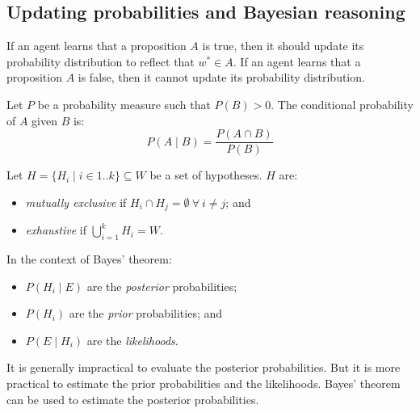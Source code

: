 \subsection{Updating probabilities and Bayesian reasoning}

If an agent learns that a proposition $A$ is true, then it should update its probability distribution to reflect that $w^* \in A$.
If an agent learns that a proposition $A$ is false, then it cannot update its probability distribution.

\begin{dfn}
  \label{def:2:ConditionalProbability}

  Let $P$ be a probability measure such that $P(B)>0$.
  The conditional probability of $A$ given $B$ is:
  \begin{equation}\label{eqn:2:ConditionalProbability}
    P(A \mid B) = \frac{P(A \cap B)}{P(B)}
  \end{equation}
\end{dfn}

Let $H = \{H_i \mid i \in 1 .. k\}\subseteq W$ be a set of hypotheses.
$H$ are:
\begin{itemize}
  \item \textit{mutually exclusive} if $H_i \cap H_j = \emptyset\ \forall\ i \neq j$; and
  \item \textit{exhaustive} if $\bigcup_{i = 1}^{k} H_i = W$.
\end{itemize}
In the context of Bayes' theorem:
\begin{itemize}
  \item $P(H_i \mid E)$ are the \textit{posterior} probabilities;
  \item $P(H_i)$ are the \textit{prior} probabilities; and
  \item $P(E \mid H_i)$ are the \textit{likelihoods}.
\end{itemize}

It is generally impractical to evaluate the posterior probabilities.
But it is more practical to estimate the prior probabilities and the likelihoods.
Bayes' theorem can be used to estimate the posterior probabilities.

